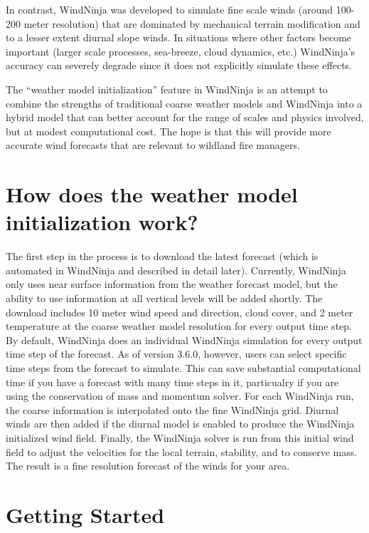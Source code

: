 \documentclass[12pt]{article}
\begin{document}
In contrast, WindNinja was developed to simulate fine scale winds (around 100-200 meter resolution) that are dominated by mechanical terrain modification and to a lesser extent diurnal slope winds.  In situations where other factors become important (larger scale processes, sea-breeze, cloud dynamics, etc.) WindNinja's accuracy can severely degrade since it does not explicitly simulate these effects.

The “weather model initialization” feature in WindNinja is an attempt to combine the strengths of traditional coarse weather models and WindNinja into a hybrid model that can better account for the range of scales and physics involved, but at modest computational cost.  The hope is that this will provide more accurate wind forecasts that are relevant to wildland fire managers.

\section*{How does the weather model initialization work?}

The first step in the process is to download the latest forecast (which is automated in WindNinja and described in detail later).  Currently, WindNinja only uses near surface information from the weather forecast model, but the ability to use information at all vertical levels will be added shortly.  The download includes 10 meter wind speed and direction, cloud cover, and 2 meter temperature at the coarse weather model resolution for every output time step.  By default, WindNinja does an individual WindNinja simulation for every output time step of the forecast.  As of version 3.6.0, however, users can select specific time steps from the forecast to simulate. This can save substantial computational time if you have a forecast with many time steps in it, particualry if you are using the conservation of mass and momentum solver. For each WindNinja run, the coarse information is interpolated onto the fine WindNinja grid.  Diurnal winds are then added if the diurnal model is enabled to produce the WindNinja initialized wind field.  Finally, the WindNinja solver is run from this initial wind field to adjust the velocities for the local terrain, stability, and to conserve mass.  The result is a fine resolution forecast of the winds for your area.

\section{Getting Started}
\end{document}
